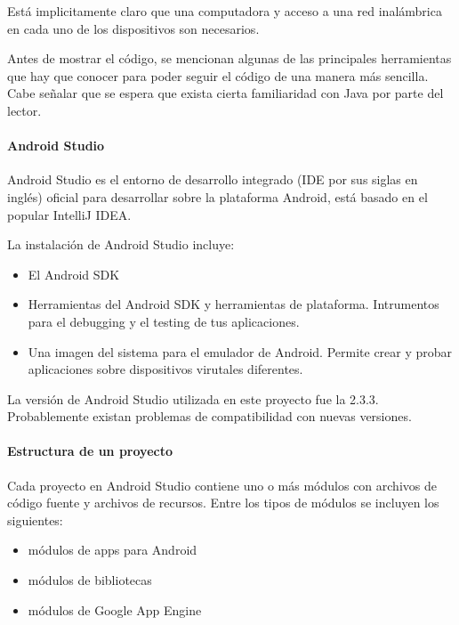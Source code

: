 Está implicitamente claro que una computadora y acceso a una red inalámbrica
en cada uno de los dispositivos son necesarios.

Antes de mostrar el código, se mencionan algunas de las principales herramientas
que hay que conocer para poder seguir el código de una manera más sencilla.
Cabe señalar que se espera que exista cierta familiaridad con
Java por parte del lector.


\paragraph{Android Studio}
\label{\detokenize{dev_docs:android-studio}}
Android Studio es el entorno de desarrollo integrado (IDE por sus siglas en
inglés) oficial para desarrollar sobre la plataforma Android, está basado en
el popular IntelliJ IDEA.

La instalación de Android Studio incluye:
\begin{itemize}
\item {} 
El Android SDK

\item {} 
Herramientas del Android SDK y herramientas de plataforma. Intrumentos para el debugging y el testing de tus aplicaciones.

\item {} 
Una imagen del sistema para el emulador de Android. Permite crear y probar aplicaciones sobre dispositivos virutales diferentes.

\end{itemize}

La versión de Android Studio utilizada en este proyecto fue la 2.3.3. Probablemente
existan problemas de compatibilidad con nuevas versiones.


\paragraph{Estructura de un proyecto}
\label{\detokenize{dev_docs:estructura-de-un-proyecto}}
Cada proyecto en Android Studio contiene uno o más módulos con archivos de código fuente y archivos de recursos. Entre los tipos de módulos se incluyen los siguientes:
\begin{itemize}
\item {} 
módulos de apps para Android

\item {} 
módulos de bibliotecas

\item {} 
módulos de Google App Engine

\end{itemize}

